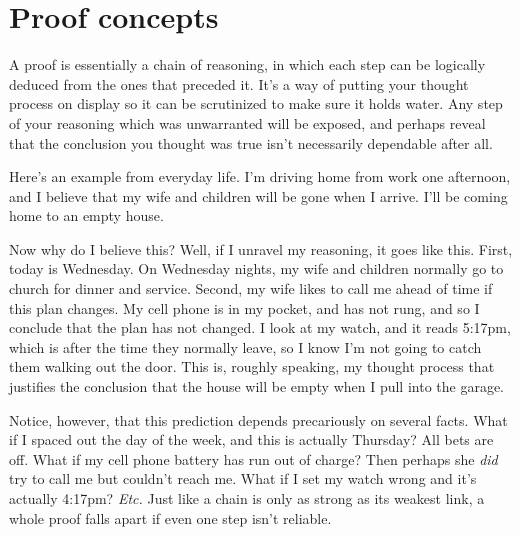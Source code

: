 \section{Proof concepts}

A proof is essentially a chain of reasoning, in which each step can be
logically deduced from the ones that preceded it. It's a way of putting
your thought process on display so it can be scrutinized to make sure it
holds water. Any step of your reasoning which was unwarranted will be
exposed, and perhaps reveal that the conclusion you thought was true isn't
necessarily dependable after all.

Here's an example from everyday life. I'm driving home from work one
afternoon, and I believe that my wife and children will be gone when I
arrive. I'll be coming home to an empty house. 

Now why do I believe this? Well, if I unravel my reasoning, it goes like
this. First, today is Wednesday. On Wednesday nights, my wife and children
normally go to church for dinner and service. Second, my wife likes to call
me ahead of time if this plan changes. My cell phone is in my pocket, and
has not rung, and so I conclude that the plan has not changed. I look at my
watch, and it reads 5:17pm, which is after the time they normally leave, so
I know I'm not going to catch them walking out the door. This is, roughly
speaking, my thought process that justifies the conclusion that the house
will be empty when I pull into the garage.

Notice, however, that this prediction depends precariously on several
facts. What if I spaced out the day of the week, and this is actually
Thursday? All bets are off. What if my cell phone battery has run out of
charge? Then perhaps she \textit{did} try to call me but couldn't reach me.
What if I set my watch wrong and it's actually 4:17pm? \textit{Etc.} Just
like a chain is only as strong as its weakest link, a whole proof falls
apart if even one step isn't reliable.

